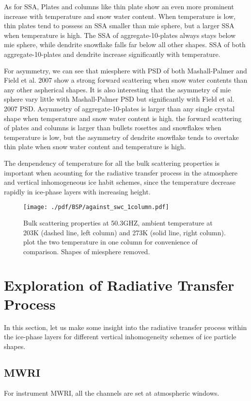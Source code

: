 \documentclass[a4paper]{report}
\begin{document}
As for SSA, Plates and columns like thin plate show an even more prominent increase with temperature and snow water content. When temperature is low,
thin plates tend to possess an SSA smaller than mie sphere, but a larger SSA when temperature is high. The SSA of aggregate-10-plates 
always stays below mie sphere, while dendrite snowflake falls far below all other shapes. SSA of both aggregate-10-plates and dendrite
increase significantly with temperature.

For asymmetry, we can see that miesphere with PSD of both Mashall-Palmer and Field et al. 2007 show a strong forward scattering when snow
water contents than any other aspherical shapes. 
It is also interesting that the asymmetry of mie sphere vary little with Mashall-Palmer PSD but significantly with Field et al. 2007 PSD.
Asymmetry of aggregate-10-plates is larger than any single crystal shape when temperature and snow water content is high.
the forward scattering of plates and columns is larger than bullets rosettes and snowflakes when temperature is low, but the asymmetry
of dendrite snowflake tends to overtake thin plate when snow water content and temperature is high.

The denpendency of temperature for all the bulk scattering properties is important when acounting for the radiative transfer process in the
atmosphere and vertical inhomogeneous ice habit schemes, since the temperature decrease rapidly in ice-phase layers with increasing height.

\begin{figure}[hbtp] 
\centering
\texttt{[image: ./pdf/BSP/against\_swc\_1column.pdf]}
\caption{Bulk scattering properties at 50.3GHZ, ambient temperature at 203K (dashed line, left column) and 273K (solid line, right column).
plot the two temperature in one column for convenience of comparison. Shapes of miesphere removed.}
\label{fig:against_swc_1column}
\end{figure}

\clearpage

\section{Exploration of Radiative Transfer Process}

In this section, let us make some insight into the radiative transfer process within the ice-phase layers for 
different vertical inhomogeneity schemes of ice particle shapes.

\subsection{MWRI}
For instrument MWRI, all the channels are set at atmospheric windows.
\end{document}
